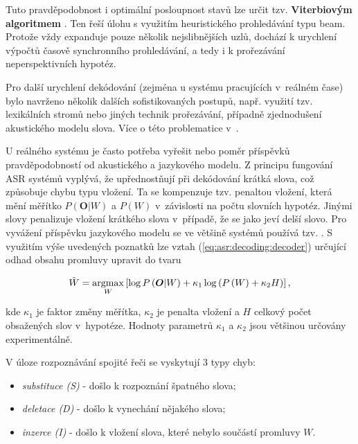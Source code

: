 \noindent Tuto pravděpodobnost i optimální posloupnost stavů lze určit tzv. \textbf{Viterbiovým algoritmem} \cite{Holmes2001}. Ten řeší úlohu s využitím heuristického prohledávání typu beam. Protože vždy expanduje pouze několik nejslibnějších uzlů, dochází k urychlení výpočtů časově synchronního prohledávání, a tedy i k prořezávání neperspektivních hypotéz.

Pro další urychlení dekódování (zejména u systému pracujících v~reálném čase) bylo navrženo několik dalších sofistikovaných postupů, např. využití tzv. lexikálních stromů nebo jiných technik prořezávání, případně zjednodušení akustického modelu slova. Více o této problematice v~\cite{Psutka2006}.

U reálného systému je často potřeba vyřešit nebo  poměr příspěvků pravděpodobností od akustického a jazykového modelu. Z principu fungování ASR systémů vyplývá, že upřednostňují při dekódování krátká slova, což způsobuje chybu typu vložení. Ta se kompenzuje tzv. penaltou vložení, která mění měřítko $P(\boldsymbol{O}|W)$ a $P(W)$ v~závislosti na počtu slovních hypotéz. Jinými slovy penalizuje vložení krátkého slova v~případě, že se jako  jeví delší slovo. Pro vyvážení příspěvku jazykového modelu se ve většině systémů používá tzv. . S využitím výše uvedených poznatků lze vztah (\ref{eq:asr:decoding:decoder}) určující odhad obsahu promluvy upravit do tvaru

\begin{equation}
  \hat{W} = \operatorname*{argmax}_{W} \left[\log P\left(\boldsymbol{O}|W\right) + \kappa_1 \log\left(P\left(W\right) + \kappa_2H\right)\right],
  \label{eq:asr:decoding:compensated}
\end{equation}

\noindent kde $\kappa_1$ je faktor změny měřítka, $\kappa_2$ je penalta vložení a $H$ celkový počet obsažených slov v~hypotéze. Hodnoty parametrů $\kappa_1$ a $\kappa_2$ jsou většinou určovány experimentálně.

V úloze rozpoznávání spojité řeči se vyskytují 3 typy chyb:

\begin{itemize}
  \item \textit{substituce (S)} - došlo k rozpoznání špatného slova;
  \item \textit{deletace (D)} - došlo k vynechání nějakého slova;
  \item \textit{inzerce (I)} - došlo k vložení slova, které nebylo součástí promluvy $W$.
\end{itemize}

